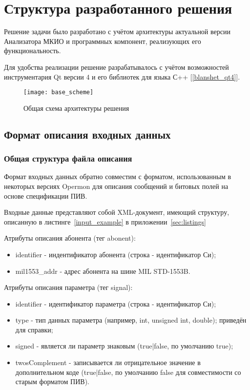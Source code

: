 \section{Структура разработанного решения}
\label{sec:struct}

Решение задачи было разработано с учётом архитектуры актуальной версии 
Анализатора МКИО и программных компонент, реализующих его функциональность.

Для удобства реализации решение разрабатывалось с учётом возможностей 
инструментария Qt версии 4 и его библиотек для языка С++ [\ref{blanshet_qt4}].

\begin{figure}[h]
\centering
\texttt{[image: base\_scheme]}
\caption{Общая схема архитектуры решения}
\label{figure:base_scheme}
\end{figure}

\subsection{Формат описания входных данных}
\label{sec:input_format}

\subsubsection{Общая структура файла описания}
Формат входных данных обратно совместим с форматом, использованным в некоторых 
версиях Opermon для описания сообщений и битовых полей на основе спецификации 
ПИВ.

Входные данные представляют собой XML-документ, имеющий структуру, описанную в 
листинге~\ref{input_example} в приложении~\ref{sec:listings}

Атрибуты описания абонента (тег abonent):

\begin{itemize}
 \item identifier - индентификатор абонента (строка - идентификатор Си);
 \item mil1553\_addr - адрес абонента на шине MIL STD-1553B.
\end{itemize}

Атрибуты описания параметра (тег signal):

\begin{itemize}
 \item identifier - идентификатор параметра (строка - идентификатор Си);
 \item type - тип данных параметра (например, int, unsigned int, double); 
приведён для справки;
 \item signed - является ли параметр знаковым (true|false, по умолчанию true);
 \item twosComplement - записывается ли отрицательное значение в 
дополнительном коде (true|false, по умолчанию false для совместимости со 
старым форматом ПИВ).
\end{itemize}

